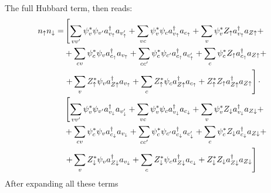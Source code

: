 The full Hubbard term, then reads:
\begin{equation}
  \begin{split}
    n_\uparrow n_\downarrow =&
    \left[\sum_{vv'}\psi_v^*\psi_{v'}a^{\dagger}_{v_\uparrow}a_{v'_\uparrow}+
    \sum_{vc}\psi_v^*\psi_ca^{\dagger}_{v_\uparrow}a_{c_\uparrow}+
    \sum_v\psi_v^*Z_\uparrow a^{\dagger}_{v_\uparrow}a_{Z\uparrow}+\right.\\
    &+\sum_{cv}\psi_c^*\psi_va^{\dagger}_{c_\uparrow}a_{v_\uparrow}+
    \sum_{cc'}\psi_c^*\psi_{c'}a^{\dagger}_{c_\uparrow}a_{c'_\uparrow}+
    \sum_c\psi_c^*Z_\uparrow a^{\dagger}_{c_\uparrow}a_{Z\uparrow}+\\
    &\left.+\sum_v Z^*_\uparrow\psi_va^{\dagger}_{Z\uparrow}a_{v_\uparrow}+
    \sum_cZ^*_\uparrow\psi_ca^{\dagger}_{Z\uparrow}a_{c_\uparrow}+
    Z^*_\uparrow Z_\uparrow a^{\dagger}_{Z\uparrow}a_{Z\uparrow}\right]\cdot\\
    &\left[\sum_{vv'}\psi_v^*\psi_{v'}a^{\dagger}_{v_\downarrow}a_{v'_\downarrow}+
    \sum_{vc}\psi_v^*\psi_ca^{\dagger}_{v_\downarrow}a_{c_\downarrow}+
    \sum_v\psi_v^*Z_\downarrow a^{\dagger}_{v_\downarrow}a_{Z\downarrow}+\right.\\
    &+\sum_{cv}\psi_c^*\psi_va^{\dagger}_{c_\downarrow}a_{v_\downarrow}+
    \sum_{cc'}\psi_c^*\psi_{c'}a^{\dagger}_{c_\downarrow}a_{c'_\downarrow}+
    \sum_c\psi_c^*Z_\downarrow a^{\dagger}_{c_\downarrow}a_{Z\downarrow}+\\
    &\left.+\sum_v Z^*_\downarrow\psi_va^{\dagger}_{Z\downarrow}a_{v_\downarrow}+
    \sum_cZ^*_\downarrow\psi_ca^{\dagger}_{Z\downarrow}a_{c_\downarrow}+
    Z^*_\downarrow Z_\downarrow a^{\dagger}_{Z\downarrow}a_{Z\downarrow}\right]
  \end{split}
\end{equation}
After expanding all these terms
